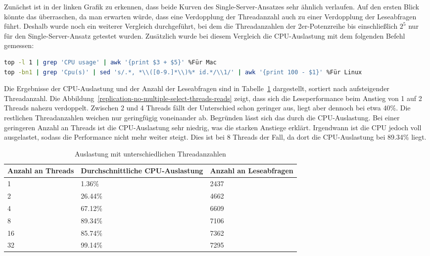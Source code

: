 Zunächst ist in der linken Grafik zu erkennen, dass beide Kurven des Single-Server-Ansatzes sehr ähnlich verlaufen.
Auf den ersten Blick könnte das überraschen, da man erwarten würde, dass eine Verdopplung der Threadanzahl auch zu einer Verdopplung der Leseabfragen führt.
Deshalb wurde noch ein weiterer Vergleich durchgeführt, bei dem die Threadanzahlen der 2er-Potenzreihe bis einschließlich $2^5$ nur für den Single-Server-Ansatz getestet wurden.
Zusätzlich wurde bei diesem Vergleich die CPU-Auslastung mit dem folgenden Befehl gemessen:

\vspace{-5pt}
\begin{lstlisting}[language=bash,caption=Messen der CPU-Auslastung,label={lst:replication-cpu-usage},style=custom_daniel,basicstyle=\ttfamily\scriptsize]
top -l 1 | grep 'CPU usage' | awk '{print $3 + $5}' %Für Mac
top -bn1 | grep 'Cpu(s)' | sed 's/.*, *\\([0-9.]*\\)%* id.*/\\1/' | awk '{print 100 - $1}' %Für Linux
\end{lstlisting}
\vspace{-5pt}

Die Ergebnisse der CPU-Auslastung und der Anzahl der Leseabfragen sind in Tabelle~\ref{tab:replication-multiple-select-threads} dargestellt, sortiert nach aufsteigender Threadanzahl.
Die Abbildung~\ref{replication-no-multiple-select-threads-reads} zeigt, dass sich die Leseperformance beim Anstieg von 1 auf 2 Threads nahezu verdoppelt.
Zwischen 2 und 4 Threads fällt der Unterschied schon geringer aus, liegt aber dennoch bei etwa 40\%.
Die restlichen Threadanzahlen weichen nur geringfügig voneinander ab.
Begründen lässt sich das durch die CPU-Auslastung.
Bei einer geringeren Anzahl an Threads ist die CPU-Auslastung sehr niedrig, was die starken Anstiege erklärt.
Irgendwann ist die CPU jedoch voll ausgelastet, sodass die Performance nicht mehr weiter steigt.
Dies ist bei 8 Threads der Fall, da dort die CPU-Auslastung bei 89.34\% liegt.

\vspace{-2pt}
\begin{table}[H]
  \centering
  \scriptsize
  \begin{tabular}{|l|l|l|}
    \hline
    \textbf{Anzahl an Threads} & \textbf{Durchschnittliche CPU-Auslastung} & \textbf{Anzahl an Leseabfragen} \\
    \hline
    1 & 1.36\% & 2437 \\
    2 & 26.44\% & 4662 \\
    4 & 67.12\% & 6609 \\
    8 & 89.34\% & 7106 \\
    16 & 85.74\% & 7362 \\
    32 & 99.14\% & 7295 \\
    \hline
  \end{tabular}
  \vspace{3pt}
  \caption{Auslastung mit unterschiedlichen Threadanzahlen}
  \label{tab:replication-multiple-select-threads}
\end{table}
\vspace{-25pt}

